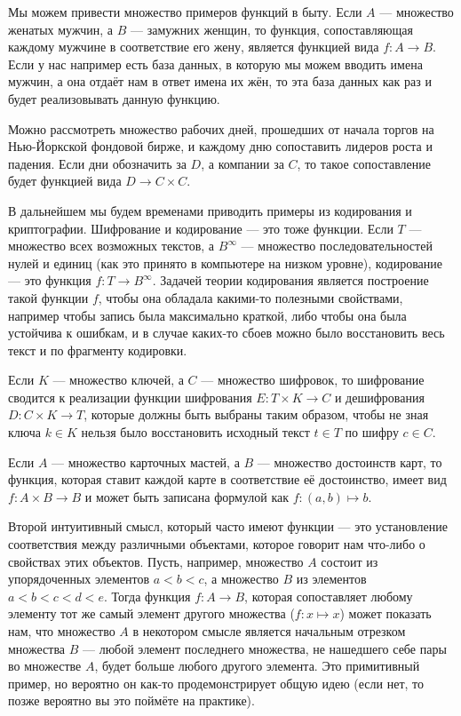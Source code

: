 Мы можем привести множество примеров функций в быту. Если $A$ — множество женатых мужчин, а $B$ — замужних женщин, то функция, сопоставляющая каждому мужчине в соответствие его жену, является функцией вида $f: A\to B$. Если у нас например есть база данных, в которую мы можем вводить имена мужчин, а она отдаёт нам в ответ имена их жён, то эта база данных как раз и будет реализовывать данную функцию.

Можно рассмотреть множество рабочих дней, прошедших от начала торгов на Нью-Йоркской фондовой бирже, и каждому дню сопоставить лидеров роста и падения. Если дни обозначить за $D$, а компании за $C$, то такое сопоставление будет функцией вида $D\to C\times C$.

В дальнейшем мы будем временами приводить примеры из кодирования и криптографии. Шифрование и кодирование — это тоже функции. Если $T$ — множество всех возможных текстов, а $B^\infty$ — множество последовательностей нулей и единиц (как это принято в компьютере на низком уровне), кодирование — это функция $f:T\to B^\infty$. Задачей теории кодирования является построение такой функции $f$, чтобы она обладала какими-то полезными свойствами, например чтобы запись была максимально краткой, либо чтобы она была устойчива к ошибкам, и в случае каких-то сбоев можно было восстановить весь текст и по фрагменту кодировки.

Если $K$ — множество ключей, а $C$ — множество шифровок, то шифрование сводится к реализации функции шифрования $E: T\times K \to C$ и дешифрования $D: C\times K \to T$, которые должны быть выбраны таким образом, чтобы не зная ключа $k\in K$ нельзя было восстановить исходный текст $t \in T$ по шифру $c \in C$.

Если $A$ — множество карточных мастей, а $B$ — множество достоинств карт, то функция, которая ставит каждой карте в соответствие её достоинство, имеет вид $f: A\times B \to B$ и может быть записана формулой как $f: (a, b) \mapsto b$.

Второй интуитивный смысл, который часто имеют функции — это установление соответствия между различными объектами, которое говорит нам что-либо о свойствах этих объектов. Пусть, например, множество $A$ состоит из упорядоченных элементов $a<b<c$, а множество $B$ из элементов $a<b<c<d<e$. Тогда функция $f:A \to B$, которая сопоставляет любому элементу тот же самый элемент другого множества ($f: x\mapsto x$) может показать нам, что множество $A$ в некотором смысле является начальным отрезком множества $B$ — любой элемент последнего множества, не нашедшего себе пары во множестве $A$, будет больше любого другого элемента. Это примитивный пример, но вероятно он как-то продемонстрирует общую идею (если нет, то позже вероятно вы это поймёте на практике).

